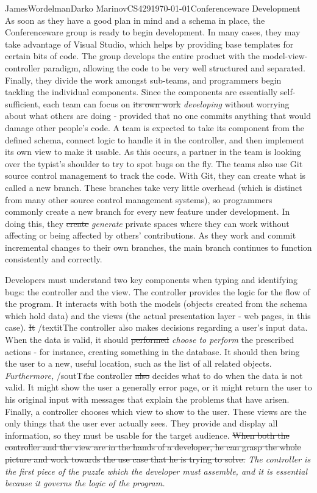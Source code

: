 \documentclass[12pt,letterpaper]{article}
\begin{document}
\begin{mla}{James}{Wordelman}{Darko Marinov}{CS429}{\today}{Conferenceware
Development}
As soon as they have a good plan in mind and a schema in place, the Conferenceware group is ready to begin development. In many cases, they may take advantage of Visual Studio, which helps by providing base templates for certain bits of code. The group develops the entire product with the model-view-controller paradigm, allowing the code to be very well structured and separated. Finally, they divide the work amongst sub-teams, and programmers begin tackling the individual components. Since the components are essentially self-sufficient, each team can focus on \sout{its own work} \textit{developing} without worrying about what others are doing - provided that no one commits anything that would damage other people's code. A team is expected to take its component from the defined schema, connect logic to handle it in the controller, and then implement its own view to make it usable. As this occurs, a partner in the team is looking over the typist's shoulder to try to spot bugs on the fly. The teams also use Git source control management to track the code. With Git, they can create what is called a new branch. These branches take very little overhead (which is distinct from many other source control management systems), so programmers commonly create a new branch for every new feature under development. In doing this, they \sout{create} \textit{generate} private spaces where they can work without affecting or being affected by others' contributions.  As they work and commit incremental changes to their own branches, the main branch continues to function consistently and correctly.

Developers must understand two key components when typing and identifying bugs: the controller and the view. The controller provides the logic for the flow of the program. It interacts with both the models (objects created from the schema which hold data) and the views (the actual presentation layer - web pages, in this case). \sout{It} /textit{The controller also} makes decisions regarding a user's input data. When the data is valid, it should \sout{performed} \textit{choose to perform} the prescribed actions - for instance, creating something in the database. It should then bring the user to a new, useful location, such as the list of all related objects. \textit{Furthermore,} /sout{T}\textit{t}he controller \sout{also} decides what to do when the data is not valid. It might show the user a generally error page, or it might return the user to his original input with messages that explain the problems that have arisen. Finally, a controller chooses which view to show to the user. These views are the only things that the user ever actually sees. They provide and display all information, so they must be usable for the target audience. \sout{When both the controller and the view are in the hands of a developer, he can grasp the whole picture and work towards the use case that he is trying to solve.} \textit{The controller is the first piece of the puzzle which the developer must assemble, and it is essential because it governs the logic of the program.}


\end{mla}
\end{document}
